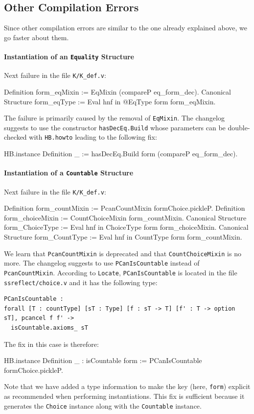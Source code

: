 \documentclass{article}
\def\coqin#1{\texttt{#1}}
\begin{document}
\subsection{Other Compilation Errors}

Since other compilation errors are similar to the one already explained above, we go faster about them.

\paragraph{Instantiation of an \coqin{Equality} Structure}

Next failure in the file \coqin{K/K_def.v}:
\begin{failure}
Definition form_eqMixin := EqMixin (compareP eq_form_dec).
Canonical Structure form_eqType := Eval hnf in @EqType form form_eqMixin.
\end{failure}
The failure is primarily caused by the removal of \coqin{EqMixin}. The changelog
suggests to use the constructor \coqin{hasDecEq.Build} whose parameters
can be double-checked with \coqin{HB.howto} leading to the following fix:
\begin{success}
HB.instance Definition _ := hasDecEq.Build form (compareP eq_form_dec).  
\end{success}

\paragraph{Instantiation of a \coqin{Countable} Structure}

Next failure in the file \coqin{K/K_def.v}:
\begin{failure}
Definition form_countMixin := PcanCountMixin formChoice.pickleP.
Definition form_choiceMixin := CountChoiceMixin form_countMixin.
Canonical Structure form_ChoiceType := Eval hnf in ChoiceType form form_choiceMixin.
Canonical Structure form_CountType := Eval hnf in CountType form form_countMixin.  
\end{failure}
We learn that \coqin{PcanCountMixin} is deprecated and that
\coqin{CountChoiceMixin} is no more. The changelog suggests to use
\coqin{PCanIsCountable} instead of \coqin{PcanCountMixin}.  According
to \coqin{Locate}, \coqin{PCanIsCountable} is located in the file
\coqin{ssreflect/choice.v} and it has the following type:
\begin{verbatim}
PCanIsCountable :
forall [T : countType] [sT : Type] [f : sT -> T] [f' : T -> option sT], pcancel f f' ->
  isCountable.axioms_ sT
\end{verbatim}
The fix in this case is therefore:
\begin{success}
HB.instance Definition _ : isCountable form := PCanIsCountable formChoice.pickleP.  
\end{success}
Note that we have added a type information to make the key (here,
\coqin{form}) explicit as recommended when performing instantiations.
This fix is sufficient because it generates the \coqin{Choice} instance
along with the \coqin{Countable} instance.



\end{document}
